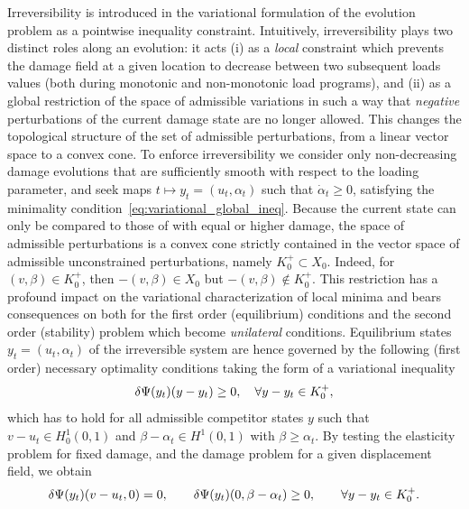 Irreversibility is introduced in the variational formulation of the evolution problem as a pointwise inequality constraint. Intuitively, irreversibility plays two distinct roles along an evolution: it acts (i) as a \emph{local} constraint which prevents the damage field at a given location to decrease between two subsequent loads values (both during monotonic and non-monotonic load programs), and (ii) as a global restriction of the space of admissible variations in such a way that \emph{negative} perturbations of the current damage state are no longer allowed. This changes the topological structure of the set of admissible perturbations, from a linear vector space to a convex cone.
To enforce irreversibility we consider only non-decreasing damage evolutions that are sufficiently smooth with respect to the loading parameter, and seek maps $t\mapsto y_t = (u_t, \alpha_t)$ such that $\dot \alpha_t \geq 0$,  satisfying the minimality condition~\eqref{eq:variational_global_ineq}.
Because the current state can only be compared to those of with equal or higher damage, the space of admissible perturbations is a  convex cone strictly contained in the vector space of admissible unconstrained perturbations, namely $K^+_0\subset X_0$. Indeed, for $(v, \beta)\in K^+_0$, then $-(v, \beta) \in X_0$ but $-(v, \beta)\notin K^+_0$. This restriction has a profound impact on the variational characterization of local minima and bears consequences on both for the first order (equilibrium) conditions and the second order (stability) problem which become \emph{unilateral} conditions.
Equilibrium states $y_t=(u_t, \alpha_t)$ of the irreversible system are hence governed by the following (first order) necessary optimality conditions taking the form of a variational inequality
\begin{equation}
    \label{eq:eq_variational_inequality_full}
    \delta \Psi(y_t)(y-y_t) \geq 0, \quad \forall y-y_t \in K^+_0,
\end{equation}
% 
which has to hold for all admissible competitor states $y$ such that $v-u_t \in H^1_0(0, 1)$ and $\beta-\alpha_t\in H^1(0,1)$ with $\beta \geq \alpha_t$.
By testing the elasticity problem for fixed damage, and the damage problem for a given displacement field, we obtain
\begin{equation}
    \label{eq:variational_equilibrium}
    \delta \Psi(y_t)(v-u_t, 0) = 0, \qquad \delta \Psi(y_t)(0, \beta-\alpha_t) \geq 0, \qquad \forall y-y_t \in K^+_{0}.
\end{equation}
